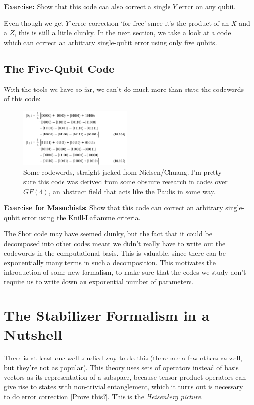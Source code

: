 \documentclass[10pt,a4paper, english]{scrartcl}
\begin{document}
\textbf{Exercise: } Show that this code can also correct a single $Y$ error on any qubit. 

Even though we get $Y$ error correction `for free' since it's the product of an $X$ and a $Z$, this is still a little clunky. In the next section, we take a look at a code which can correct an arbitrary single-qubit error using only five qubits.
\subsection{The Five-Qubit Code}
With the tools we have so far, we can't do much more than state the codewords of this code:
\begin{figure}[!h]
\centering
\includegraphics[width=0.5\textwidth]{five_qubit_codewords.png}
\caption{Some codewords, straight jacked from Nielsen/Chuang. I'm pretty sure this code was derived from some obscure research in codes over $GF(4)$, an abstract field that acts like the Paulis in some way.}
\end{figure}
\textbf{Exercise for Masochists: }Show that this code can correct an arbitrary single-qubit error using the Knill-Laflamme criteria.

The Shor code may have seemed clunky, but the fact that it could be decomposed into other codes meant we didn't really have to write out the codewords in the computational basis.
This is valuable, since there can be exponentially many terms in such a decomposition. 
This motivates the introduction of some new formalism, to make sure that the codes we study don't require us to write down an exponential number of parameters.
\section{The Stabilizer Formalism in a Nutshell}
There is at least one well-studied way to do this (there are a few others as well, but they're not as popular).
This theory uses sets of operators instead of basis vectors as its representation of a subspace, because tensor-product operators can give rise to states with non-trivial entanglement, which it turns out is necessary to do error correction [Prove this?].
This is the \emph{Heisenberg picture}. 
\end{document}
